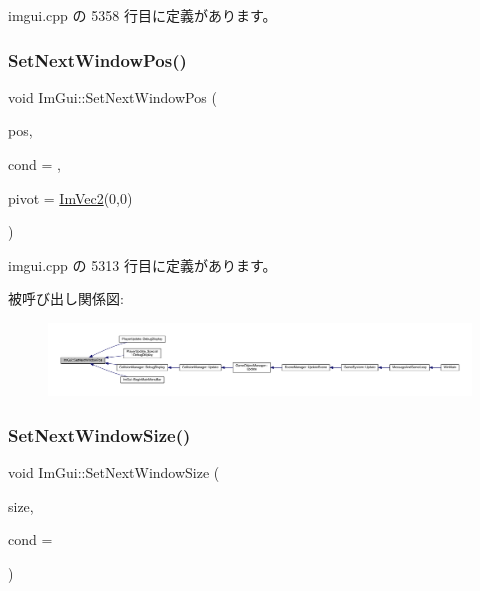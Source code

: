  imgui.\+cpp の 5358 行目に定義があります。

\mbox{\label{namespace_im_gui_afbccd31113430670b5ab2bf0d6f509bf}} 
\subsubsection{\texorpdfstring{Set\+Next\+Window\+Pos()}{SetNextWindowPos()}}
{\footnotesize\ttfamily void Im\+Gui\+::\+Set\+Next\+Window\+Pos (\begin{DoxyParamCaption}\item[{const \mbox{\hyperlink{struct_im_vec2}{Im\+Vec2}} \&}]{pos,  }\item[{\mbox{\hyperlink{imgui_8h_aef890d6ac872e12c5804d0b3e4f7f103}{Im\+Gui\+Cond}}}]{cond = {},  }\item[{const \mbox{\hyperlink{struct_im_vec2}{Im\+Vec2}} \&}]{pivot = {\ttfamily \mbox{\hyperlink{struct_im_vec2}{Im\+Vec2}}(0,0)} }\end{DoxyParamCaption})}



 imgui.\+cpp の 5313 行目に定義があります。

被呼び出し関係図\+:
\nopagebreak
\begin{figure}[H]
\begin{center}
\leavevmode
\includegraphics[width=350pt]{namespace_im_gui_afbccd31113430670b5ab2bf0d6f509bf_icgraph}
\end{center}
\end{figure}
\mbox{\label{namespace_im_gui_ab33717bb71ef5e393ae18656fc6b229d}} 
\subsubsection{\texorpdfstring{Set\+Next\+Window\+Size()}{SetNextWindowSize()}}
{\footnotesize\ttfamily void Im\+Gui\+::\+Set\+Next\+Window\+Size (\begin{DoxyParamCaption}\item[{const \mbox{\hyperlink{struct_im_vec2}{Im\+Vec2}} \&}]{size,  }\item[{\mbox{\hyperlink{imgui_8h_aef890d6ac872e12c5804d0b3e4f7f103}{Im\+Gui\+Cond}}}]{cond = {} }\end{DoxyParamCaption})}



